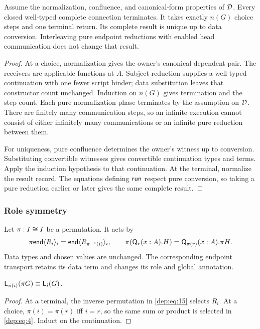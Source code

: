 \begin{lemma}
\label{thm:termination}
Assume the normalization, confluence, and canonical-form properties of $\mathcal D$.
Every closed well-typed complete connection terminates. It takes exactly
$n(G)$ choice steps and one terminal return. Its complete result is unique up
to data conversion. Interleaving pure endpoint reductions with enabled head
communication does not change that result.
\end{lemma}
\begin{proof}
At a choice, normalization gives the owner's canonical dependent pair. The
receivers are applicable functions at $A$. Subject reduction supplies a
well-typed continuation with one fewer script binder; data substitution leaves
that constructor count unchanged. Induction on $n(G)$ gives termination and
the step count. Each pure normalization phase terminates by the assumption on
$\mathcal D$. There are finitely many communication steps, so an infinite execution
cannot consist of either infinitely many communications or an infinite pure
reduction between them.

For uniqueness, pure confluence determines the owner's witness up to
conversion. Substituting convertible witnesses gives convertible continuation
types and terms. Apply the induction hypothesis to that continuation. At the
terminal, normalize the result record. The equations defining $\mathsf{run}$ respect
pure conversion, so taking a pure reduction earlier or later gives the same
complete result.
\end{proof}

\subsubsection{Role symmetry}

Let $\pi:I\cong I$ be a permutation. It acts by
\begin{equation}
 \pi\mathsf{end}\langle R_i\rangle_i
   =\mathsf{end}\langle R_{\pi^{-1}(i)}\rangle_i,
 \qquad
 \pi(\mathsf Q_r(x:A).H)=\mathsf Q_{\pi(r)}(x:A).\pi H.
 \label{dep:eq:15}
\end{equation}
Data types and chosen values are unchanged. The corresponding endpoint
transport retains its data term and changes its role and global annotation.

\begin{lemma}
\label{lem:role-transport}
$\mathsf L_{\pi(i)}(\pi G)\mathrel{\equiv}\mathsf L_{i}(G)$.
\end{lemma}
\begin{proof}
At a terminal, the inverse permutation in \eqref{dep:eq:15} selects $R_i$. At a choice,
$\pi(i)=\pi(r)$ iff $i=r$, so the same sum or product is selected in \eqref{dep:eq:4}.
Induct on the continuation.
\end{proof}

